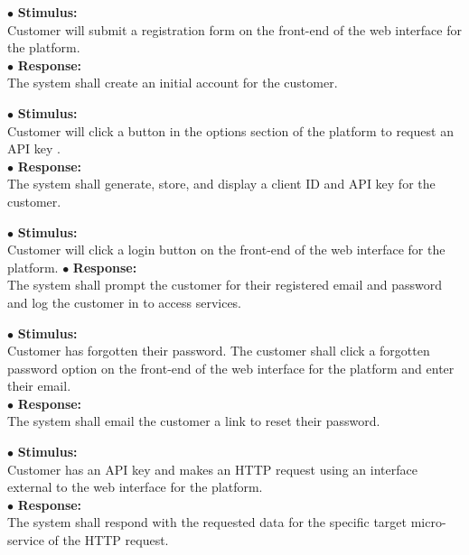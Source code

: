 \documentclass{scrreprt}
\begin{document}
\vspace{5mm}
	\hspace{-4.75mm} $\bullet$ \textbf{Stimulus:} \\ \hspace{5mm} Customer will submit a registration form on the front-end of the web interface for the platform.\\
	$\bullet$ \textbf{Response:} \\ \hspace{5mm} The system shall create an initial account for the customer.

\vspace{5mm}
	\hspace{-4.75mm} $\bullet$ \textbf{Stimulus:} \\ \hspace{5mm} Customer will click a button in the options section of the platform to request an API key .\\
	$\bullet$ \textbf{Response:} \\ \hspace{5mm} The system shall generate, store, and display a client ID and API key for the customer.

\vspace{5mm}
	\hspace{-4.75mm} $\bullet$ \textbf{Stimulus:} \\ \hspace{5mm} Customer will click a login button on the front-end of the web interface for the platform.
	$\bullet$ \textbf{Response:} \\ \hspace{5mm} The system shall prompt the customer for their registered email and password and log the customer in to access services.
\newpage

\vspace{5mm}
	\hspace{-4.75mm} $\bullet$ \textbf{Stimulus:} \\ \hspace{5mm} Customer has forgotten their password. The customer shall click a forgotten password option on the front-end of the web interface for the platform and enter their email.\\
	$\bullet$ \textbf{Response:} \\ \hspace{5mm} The system shall email the customer a link to reset their password.

\vspace{5mm}
	\hspace{-4.75mm} $\bullet$ \textbf{Stimulus:} \\ \hspace{5mm} Customer has an API key and makes an HTTP request using an interface external to the web interface for the platform.\\
	$\bullet$ \textbf{Response:} \\ \hspace{5mm} The system shall respond with the requested data for the specific target micro-service of the HTTP request.
\end{document}
